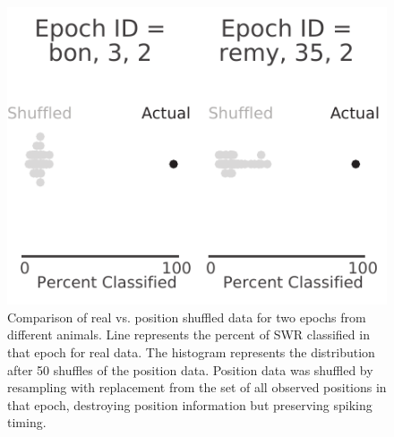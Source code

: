 \documentclass[times, twoside]{zHenriquesLab-StyleBioRxiv}
\begin{document}
\begin{figure}%
\centering
\includegraphics[width=0.80\linewidth]{figures/Figure5/Figure5_v1}
\caption{Comparison of real vs. position shuffled data for two epochs from different animals. Line represents the percent of SWR classified in that epoch for real data. The histogram represents the distribution after 50 shuffles of the position data. Position data was shuffled by resampling with replacement from the set of all observed positions in that epoch, destroying position information but preserving spiking timing.}
\label{Figure3-Figure supplement 2}
\end{figure}

\end{document}
